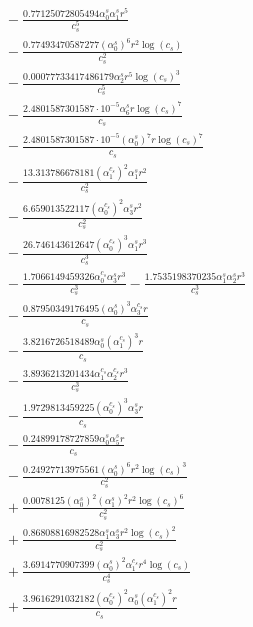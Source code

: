 \documentclass[10pt]{article}
\begin{document}
\begin{align*}
&{}  - \frac{0.77125072805494 \alpha_{0}^s \alpha_{1}^s r^{5}}{c_{s}^{5}} \\
&{}  - \frac{0.77493470587277 \left(\alpha_{0}^s\right)^{6} r^{2} \log{\left(c_{s} \right)}}{c_{s}^{2}} \\
&{}  - \frac{0.00077733417486179 \alpha_{2}^s r^{5} \log{\left(c_{s} \right)}^{3}}{c_{s}^{5}} \\
&{}  - \frac{2.4801587301587 \cdot 10^{-5} \alpha_{6}^s r \log{\left(c_{s} \right)}^{7}}{c_{s}} \\
&{}  - \frac{2.4801587301587 \cdot 10^{-5} \left(\alpha_{0}^s\right)^{7} r \log{\left(c_{s} \right)}^{7}}{c_{s}} \\
&{}  - \frac{13.313786678181 \left(\alpha_{1}^{c_s}\right)^{2} \alpha_{1}^s r^{2}}{c_{s}^{2}} \\
&{}  - \frac{6.659013522117 \left(\alpha_{0}^{c_s}\right)^{2} \alpha_{3}^s r^{2}}{c_{s}^{2}} \\
&{}  - \frac{26.746143612647 \left(\alpha_{0}^{c_s}\right)^{3} \alpha_{1}^s r^{3}}{c_{s}^{3}} \\
&{}  - \frac{1.7066149459326 \alpha_{0}^{c_s} \alpha_{3}^s r^{3}}{c_{s}^{3}} - \frac{1.7535198370235 \alpha_{1}^s \alpha_{2}^s r^{3}}{c_{s}^{3}} \\
&{}  - \frac{0.87950349176495 \left(\alpha_{0}^s\right)^{3} \alpha_{3}^{c_s} r}{c_{s}} \\
&{}  - \frac{3.8216726518489 \alpha_{0}^s \left(\alpha_{1}^{c_s}\right)^{3} r}{c_{s}} \\
&{}  - \frac{3.8936213201434 \alpha_{1}^{c_s} \alpha_{2}^{c_s} r^{3}}{c_{s}^{3}} \\
&{}  - \frac{1.9729813459225 \left(\alpha_{0}^{c_s}\right)^{3} \alpha_{3}^s r}{c_{s}} \\
&{}  - \frac{0.24899178727859 \alpha_{0}^s \alpha_{5}^s r}{c_{s}} \\
&{}  - \frac{0.24927713975561 \left(\alpha_{0}^s\right)^{6} r^{2} \log{\left(c_{s} \right)}^{3}}{c_{s}^{2}} \\
&{}  + \frac{0.0078125 \left(\alpha_{0}^s\right)^{2} \left(\alpha_{1}^s\right)^{2} r^{2} \log{\left(c_{s} \right)}^{6}}{c_{s}^{2}} \\
&{}  + \frac{0.86808816982528 \alpha_{1}^s \alpha_{3}^s r^{2} \log{\left(c_{s} \right)}^{2}}{c_{s}^{2}} \\
&{}  + \frac{3.6914770907399 \left(\alpha_{0}^s\right)^{2} \alpha_{1}^{c_s} r^{4} \log{\left(c_{s} \right)}}{c_{s}^{4}} \\
&{}  + \frac{3.9616291032182 \left(\alpha_{0}^{c_s}\right)^{2} \alpha_{0}^s \left(\alpha_{1}^{c_s}\right)^{2} r}{c_{s}} \\

\end{align*}
\end{document}
